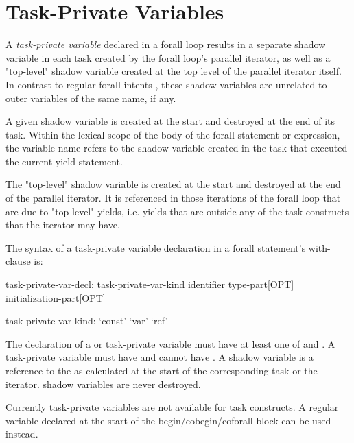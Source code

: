 \section{Task-Private Variables}
\label{Task_Private_Variables}

A \emph{task-private variable} declared in a forall loop results
in a separate shadow variable in each task created by the forall
loop's parallel iterator, as well as a "top-level" shadow variable
created at the top level of the parallel iterator itself.
In contrast to regular forall intents ,
these shadow variables are unrelated to outer variables
of the same name, if any.

A given shadow variable is created at the start and destroyed
at the end of its task.
Within the lexical scope of the body of the forall statement or expression,
the variable name refers to the shadow variable created in the task
that executed the current yield statement.

The "top-level" shadow variable is created at the start and destroyed
at the end of the parallel iterator. It is referenced in those iterations
of the forall loop that are due to "top-level" yields, i.e. yields
that are outside any of the task constructs that the iterator may have.

The syntax of a task-private variable declaration in a forall statement's
with-clause is:

\begin{syntax}
task-private-var-decl:
  task-private-var-kind identifier type-part[OPT] initialization-part[OPT]

task-private-var-kind:
  `const'
  `var'
  `ref'
\end{syntax}

The declaration of a  or  task-private variable must
have at least one of  and .
A  task-private variable must have 
and cannot have . A  shadow variable
is a reference to the  as calculated at
the start of the corresponding task or the iterator.
 shadow variables are never destroyed.

\begin{craychapel}
Currently task-private variables are not available for task constructs.
A regular variable declared at the start of the begin/cobegin/coforall
block can be used instead.
\end{craychapel}


